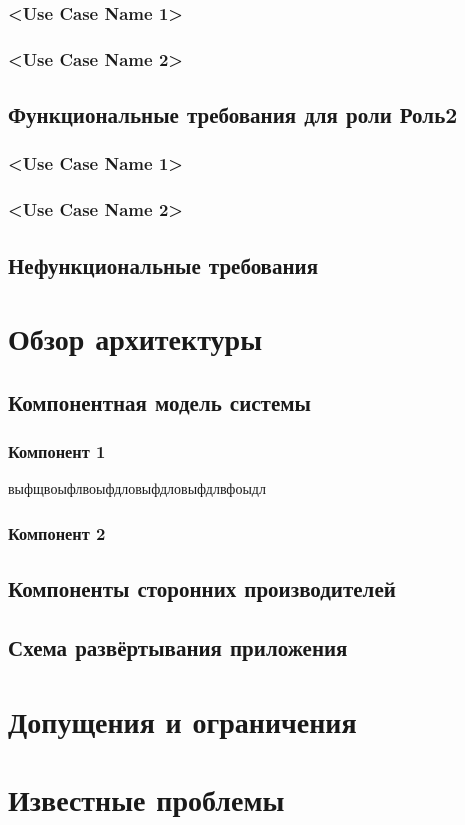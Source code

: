 \documentclass[a4paper]{report}
\begin{document}
			\subsection{<Use Case Name 1>}
		
			\subsection{<Use Case Name 2>}
		\section{Функциональные требования для роли Роль2}
			\subsection{<Use Case Name 1>}
		
			\subsection{<Use Case Name 2>}
			
		\section{Нефункциональные требования}
	\chapter{Обзор архитектуры}
		\section{Компонентная модель системы}
			\subsection{Компонент 1}
				выфщвоыфлвоыфдловыфдловыфдлвфоыдл
			\subsection{Компонент 2}
		\section{Компоненты сторонних производителей}
		
		\section{Схема развёртывания приложения}
	\chapter{Допущения и ограничения}
	
	\chapter{Известные проблемы}
\end{document}
